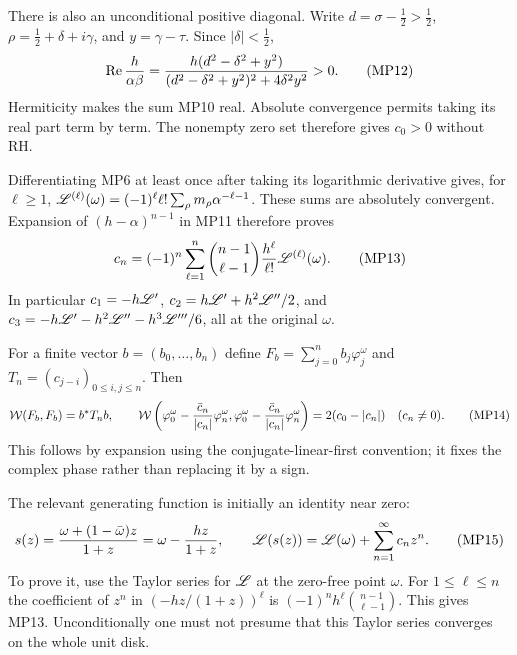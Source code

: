 \documentclass[11pt]{article}
\begin{document}
There is also an unconditional positive diagonal. Write
$d=\sigma-\tfrac12>\tfrac12$, $\rho=\tfrac12+\delta+i\gamma$, and
$y=\gamma-\tau$. Since $|\delta|<\tfrac12$,
\begin{equation}
 \operatorname{Re}\frac h{\alpha\beta}
 =\frac{h(d^2-\delta^2+y^2)}
        {(d^2-\delta^2+y^2)^2+4\delta^2y^2}>0.
 \tag{MP12}
\end{equation}
Hermiticity makes the sum MP10 real. Absolute convergence permits taking
its real part term by term. The nonempty zero set therefore gives
$c_0>0$ without RH.

Differentiating MP6 at least once after taking its logarithmic derivative
gives, for $\ell\geq1$,
$\mathscr L^{(\ell)}(\omega)=(-1)^\ell\ell!\sum_\rho
m_\rho\alpha^{-\ell-1}$. These sums are absolutely convergent.
Expansion of $(h-\alpha)^{n-1}$ in MP11 therefore proves
\begin{equation}
 c_n=(-1)^n\sum_{\ell=1}^n\binom{n-1}{\ell-1}
               \frac{h^\ell}{\ell!}\mathscr L^{(\ell)}(\omega).
 \tag{MP13}
\end{equation}
In particular $c_1=-h\mathscr L'$, $c_2=h\mathscr L'+h^2\mathscr L''/2$, and
$c_3=-h\mathscr L'-h^2\mathscr L''-h^3\mathscr L'''/6$, all at the original $\omega$.

For a finite vector $b=(b_0,\ldots,b_n)$ define
$F_b=\sum_{j=0}^n b_j\varphi_j^\omega$ and
$T_n=(c_{j-i})_{0\leq i,j\leq n}$. Then
\begin{equation}
 \mathcal W(F_b,F_b)=b^*T_nb,\qquad
 \mathcal W\left(\varphi_0^\omega-
             \frac{\bar c_n}{|c_n|}\varphi_n^\omega,
          \varphi_0^\omega-
             \frac{\bar c_n}{|c_n|}\varphi_n^\omega\right)
       =2(c_0-|c_n|)\quad(c_n\ne0).
 \tag{MP14}
\end{equation}
This follows by expansion using the conjugate-linear-first convention;
it fixes the complex phase rather than replacing it by a sign.

The relevant generating function is initially an identity near zero:
\begin{equation}
 s(z)=\frac{\omega+(1-\bar\omega)z}{1+z}
     =\omega-\frac{hz}{1+z},\qquad
 \mathscr L(s(z))=\mathscr L(\omega)+\sum_{n=1}^\infty c_n z^n.
 \tag{MP15}
\end{equation}
To prove it, use the Taylor series for $\mathscr L$ at the zero-free point
$\omega$. For $1\leq\ell\leq n$ the coefficient of $z^n$ in
$(-hz/(1+z))^\ell$ is
$(-1)^n h^\ell\binom{n-1}{\ell-1}$. This gives MP13.
Unconditionally one must not presume that this Taylor series converges
on the whole unit disk.
\end{document}
